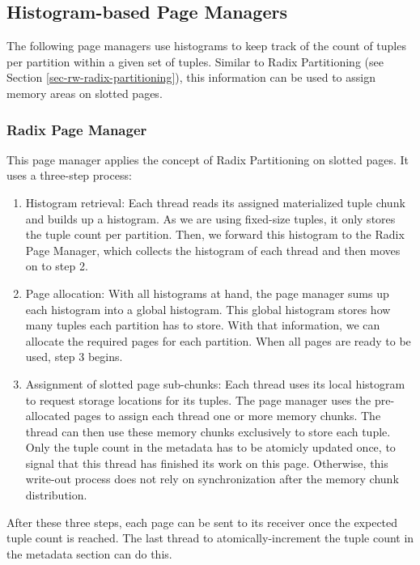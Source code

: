 \subsection{Histogram-based Page Managers}
The following page managers use histograms to keep track of the count of tuples per partition within a given set of tuples.
Similar to Radix Partitioning (see Section \ref{sec-rw-radix-partitioning}), this information can be used to assign memory areas on slotted pages.
\subsubsection{Radix Page Manager} \label{subsubsection-Radix-Page-Manager}
This page manager applies the concept of Radix Partitioning on slotted pages.
It uses a three-step process:
\begin{enumerate}
  \item Histogram retrieval: Each thread reads its assigned materialized tuple chunk and
        builds up a histogram.
        As we are using fixed-size tuples, it only stores the tuple count per partition.
        Then, we forward this histogram to the Radix Page Manager, which collects the histogram of each thread and then moves on to step 2.

  \item Page allocation: With all histograms at hand, the page manager sums up each
        histogram into a global histogram.
        This global histogram stores how many tuples each partition has to store.
        With that information, we can allocate the required pages for each partition.
        When all pages are ready to be used, step 3 begins.

  \item  Assignment of slotted page sub-chunks: Each thread uses its local histogram to
        request storage locations for its tuples.
        The page manager uses the pre-allocated pages to assign each thread one or more memory chunks.
        The thread can then use these memory chunks exclusively to store each tuple.
        Only the tuple count in the metadata has to be atomicly updated once, to signal that this thread has finished its work on this page.
        Otherwise, this write-out process does not rely on synchronization after the memory chunk distribution.
\end{enumerate}
After these three steps, each page can be sent to its receiver once the expected tuple count is reached.
The last thread to atomically-increment the tuple count in the metadata section can do this.


